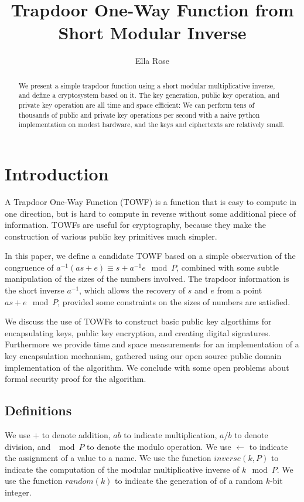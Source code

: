\documentclass[preprint]{iacrtrans}
\author{Ella Rose}
\institute{Paso Robles, CA \email{python_pride@protonmail.com}}
\title[Trapdoor One-Way Function from Short Modular Inverse]{Trapdoor One-Way Function from Short Modular Inverse}
\begin{document}
\maketitle


\begin{abstract}
 We present a simple trapdoor function using a short modular multiplicative inverse, and define a cryptosystem based on it. The key generation, public key operation, and private key operation are all time and space efficient: We can perform tens of thousands of public and private key operations per second with a naive python implementation on modest hardware, and the keys and ciphertexts are relatively small. 
 \end{abstract}

\section{Introduction}
A Trapdoor One-Way Function (TOWF) is a function that is easy to compute in one direction, but is hard to compute in reverse without some additional piece of information. TOWFs are useful for cryptography, because they make the construction of various public key primitives much simpler.

In this paper, we define a candidate TOWF based on a simple observation of the congruence of $a^{-1}(a s + e) \equiv s + a^{-1} e \mod P$, combined with some subtle manipulation of the sizes of the numbers involved. The trapdoor information is the short inverse $a^{-1}$, which allows the recovery of $s$ and $e$ from a point $a s + e \mod P$, provided some constraints on the sizes of numbers are satisfied.

We discuss the use of TOWFs to construct basic public key algorthims for encapsulating keys, public key encryption, and creating digital signatures. Furthermore we provide time and space measurements for an implementation of a key encapsulation mechanism, gathered using our open source public domain implementation of the algorithm. We conclude with some open problems about formal security proof for the algorithm.

\subsection{Definitions}
We use $+$ to denote addition, $a b$ to indicate multiplication, $a / b$ to denote division, and $\mod P$ to denote the modulo operation. We use $\leftarrow$ to indicate the assignment of a value to a name. We use the function $inverse(k, P)$ to indicate the computation of the modular multiplicative inverse of $k \mod P$. We use the function $random(k)$ to indicate the generation of of a random $k$-bit integer.
\end{document}
